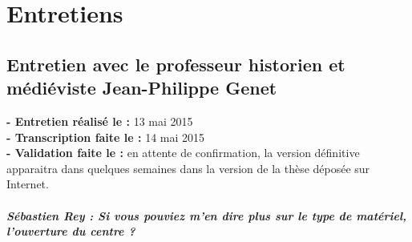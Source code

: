 

\chapter{Entretiens}
\label{chap:entretiens}

\section{Entretien avec le professeur historien et médiéviste Jean-Philippe Genet}
\label{sec:entretient_genet}

\noindent\textbf{- Entretien réalisé le : } 13 mai 2015 \\
\noindent\textbf{- Transcription faite le :} 14 mai 2015 \\
\noindent\textbf{- Validation faite le :} en attente de confirmation, la version définitive apparaitra dans quelques semaines dans la version de la thèse déposée sur Internet.

\paragraph*{Sébastien Rey : Si vous pouviez m'en dire plus sur le type de matériel, l'ouverture du centre ?}

